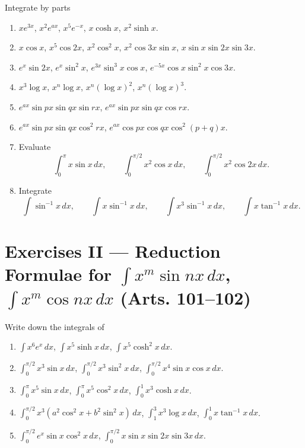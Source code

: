 \documentclass[11pt, a4paper]{article}
\begin{document}
Integrate by parts

\begin{enumerate}[leftmargin=2em]

\item $xe^{3x}$, $x^2e^{ax}$, $x^5e^{-x}$, $x\cosh x$, $x^2\sinh x$.

\item $x\cos x$, $x^5\cos 2x$, $x^2\cos^2 x$, $x^2\cos 3x\sin x$, $x\sin x\sin 2x\sin 3x$.

\item $e^x\sin 2x$, $e^x\sin^2 x$, $e^{3x}\sin^3 x\cos x$, $e^{-5x}\cos x\sin^2 x\cos 3x$.

\item $x^3\log x$, $x^n\log x$, $x^n(\log x)^2$, $x^n(\log x)^3$.

\item $e^{ax}\sin px\sin qx\sin rx$, $e^{ax}\sin px\sin qx\cos rx$.

\item $e^{ax}\sin px\sin qx\cos^2 rx$, $e^{ax}\cos px\cos qx\cos^2(p+q)x$.

\item Evaluate
\[
\int_0^\pi x\sin x\,dx, \qquad \int_0^{\pi/2} x^2\cos x\,dx, \qquad \int_0^{\pi/2} x^2\cos 2x\,dx.
\]

\item Integrate
\[
\int \sin^{-1}x\,dx, \qquad \int x\sin^{-1}x\,dx, \qquad \int x^3\sin^{-1}x\,dx, \qquad \int x\tan^{-1}x\,dx.
\]

\end{enumerate}

\section*{Exercises II --- Reduction Formulae for $\int x^m\sin nx\,dx$, $\int x^m\cos nx\,dx$ (Arts. 101--102)}

Write down the integrals of

\begin{enumerate}[leftmargin=2em]

\item $\displaystyle\int x^6e^x\,dx$, $\displaystyle\int x^5\sinh x\,dx$, $\displaystyle\int x^5\cosh^2 x\,dx$.

\item $\displaystyle\int_0^{\pi/2} x^3\sin x\,dx$, $\displaystyle\int_0^{\pi/2} x^3\sin^2 x\,dx$, $\displaystyle\int_0^{\pi/2} x^4\sin x\cos x\,dx$.

\item $\displaystyle\int_0^\pi x^5\sin x\,dx$, $\displaystyle\int_0^\pi x^5\cos^2 x\,dx$, $\displaystyle\int_0^1 x^3\cosh x\,dx$.

\item $\displaystyle\int_0^{\pi/2} x^3(a^2\cos^2 x+b^2\sin^2 x)\,dx$, $\displaystyle\int_1^3 x^3\log x\,dx$, $\displaystyle\int_0^1 x\tan^{-1}x\,dx$.

\item $\displaystyle\int_0^{\pi/2} e^x\sin x\cos^2 x\,dx$, $\displaystyle\int_0^{\pi/2} x\sin x\sin 2x\sin 3x\,dx$.

\end{enumerate}
\end{document}
